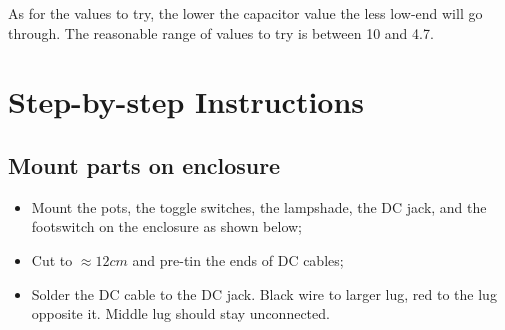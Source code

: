 \documentclass[a4paper,12pt]{article}
\begin{document}
As for the values to try, the lower the capacitor value the
less low-end will go through. The reasonable range of values
to try is between \SI{10}{\nF} and \SI{4.7}{\uF}.

\pagebreak

\section{Step-by-step Instructions}
\label{sec:steps}

\subsection{Mount parts on enclosure}

\begin{itemize}
  \item Mount the pots, the toggle switches, the lampshade,
    the DC jack, and the footswitch on the enclosure as
    shown below;
  \item Cut to $\approx12cm$ and pre-tin the ends of DC cables;
  \item Solder the DC cable to the DC jack. Black wire to
    larger lug, red to the lug opposite it. Middle lug
    should stay unconnected.
\end{itemize}

\end{document}
